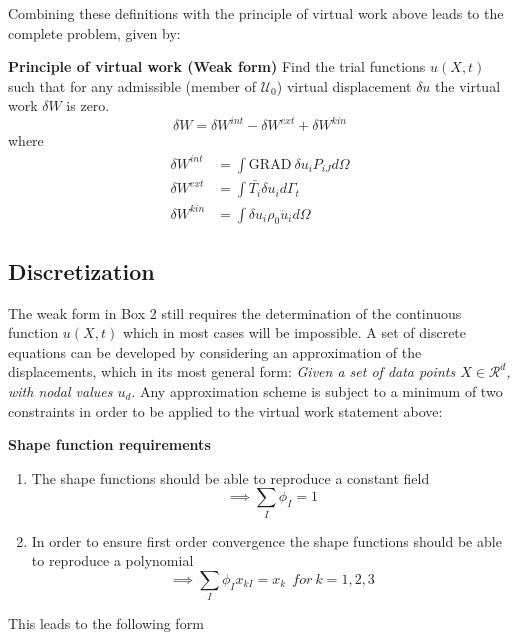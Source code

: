 Combining these definitions with the principle of virtual work above leads to the complete problem, given by:
\begin{tcolorbox}
	\textbf{Principle of virtual work (Weak form)}
	Find the trial functions $u(X,t)$ such that for any admissible (member of $\mathcal{U}_0$) virtual displacement $\delta u$ the virtual work $\delta W $ is zero.
	\begin{equation*}
	\delta W = \delta W^{int} - \delta W^{ext} + \delta W^{kin} 
	\end{equation*}
	where 
	\begin{align*}
	\delta W^{int} &= \int{\text{GRAD}~\delta u_i P_{iJ}d \Omega} \\
	\delta W^{ext} &=  \int{\bar{T_i} \delta u_i} d \Gamma_t \\
	\delta W^{kin} &= \int{\delta u_i \rho_0 \ddot{u}_i d \Omega}
	\end{align*}
\end{tcolorbox}
\subsection*{Discretization}
The weak form in Box 2 still requires the determination of the continuous function $u(X,t)$ which in most cases will be impossible. A set of discrete equations can be developed by considering an approximation of the displacements, which in its most general form: \emph{Given a set of data points $X \in \mathcal{R}^d$, with nodal values $u_d$}. Any approximation scheme is subject to a minimum of two constraints in order to be applied to the virtual work statement above:
\begin{tcolorbox}
\textbf{	Shape function requirements}
	\begin{enumerate}
		\item The shape functions should be able to reproduce a constant field
		\begin{equation*}
		\implies \sum_I \phi_I = 1
		\end{equation*}
		\item In order to ensure first order convergence the shape functions should be able to reproduce a polynomial
		\begin{equation*}
		\implies \sum_I \phi_I x_{kI} = x_k ~~ for~k=1,2,3
		\end{equation*}
	\end{enumerate}
\end{tcolorbox}
\noindent This leads to the following form

